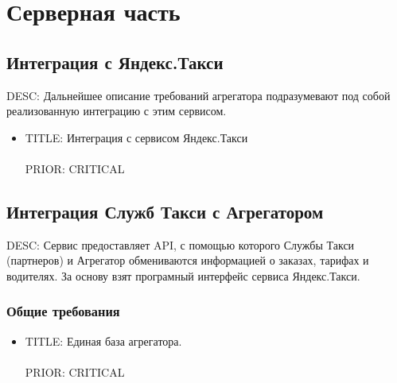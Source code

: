 \section{Серверная часть}

	\subsection{Интеграция с Яндекс.Такси}

		DESC: Дальнейшее описание требований агрегатора подразумевают под собой реализованную интеграцию с этим сервисом.  

		\begin{itemize}

		\item{
			TITLE: Интеграция с сервисом Яндекс.Такси\\
			\\
			PRIOR: CRITICAL\\
		}

		\end{itemize}

	\subsection{Интеграция Служб Такси с Агрегатором}

		DESC: Сервис предоставляет API, с помощью которого Службы Такси (партнеров) и Агрегатор обмениваются информацией о заказах, тарифах и водителях. За основу взят програмный интерфейс сервиса Яндекс.Такси.\\

		\subsubsection{Общие требования}

			\begin{itemize}

				\item {

					TITLE: Единая база агрегатора.\\
					\\
					PRIOR: CRITICAL\\

				}

			\end{itemize}

